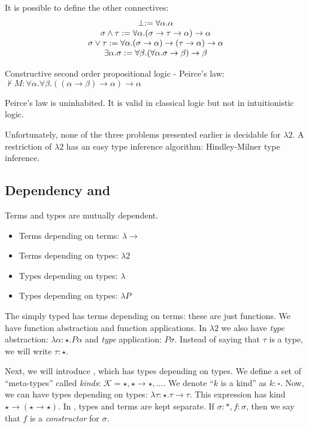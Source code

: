 It is possible to define the other connectives:
\[
\begin{array}{c}
\perp := \forall \alpha. \alpha \\
\sigma \wedge \tau := \forall \alpha. (\sigma \to \tau \to \alpha) \to \alpha \\
\sigma \vee \tau := \forall \alpha. (\sigma \to \alpha) \to (\tau \to \alpha) \to \alpha \\
\exists \alpha. \sigma := \forall \beta. (\forall \alpha. \sigma \to \beta) \to \beta
\end{array}
\]

Constructive second order propositional logic - Peirce's law: 
$\not\vdash M : \forall \alpha. \forall \beta. ((\alpha \to \beta) \to \alpha) \to \alpha$

Peirce's law is uninhabited. It is valid in classical logic but not in intuitionistic logic.

Unfortunately, none of the three problems presented earlier is decidable for $\lambda 2$. A restriction of $\lambda 2$ has
an easy type inference algorithm: Hindley-Milner type inference.

\subsection{Dependency and \wlo}
Terms and types are mutually dependent.
\begin{itemize}
\item Terms depending on terms: $\lambda \to$
\item Terms depending on types: $\lambda 2$
\item Types depending on types: $\lambda$ \underbar{$\omega$}
\item Types depending on types: $\lambda P$
\end{itemize}


The simply typed \lc has terms depending on terms: these are just functions. We have function abstraction and function applications.
In $\lambda 2$ we also have \emph{type} abstraction: $\lambda \alpha : \star. P \alpha$ and \emph{type} application: $P\sigma$. 
Instead of saying that $\tau$ is a type, we will write $\tau : \star$.

Next, we will introduce \wlo, which has types depending on types. We define a set of ``meta-types''
called \emph{kinds}: $\mathcal{K} = {\star, \star \to \star, ...}$. We denote ``$k$ is a kind'' as $k : \square$.
Now, we can have types depending on types:  $\lambda \tau: \star. \tau \to \tau$. This expression has kind $\star \to (\star \to \star)$.
In \wlo, types and terms are kept separate. If $\sigma : *, f : \sigma$, then we say that $f$ is a \emph{constructor} for $\sigma$.

